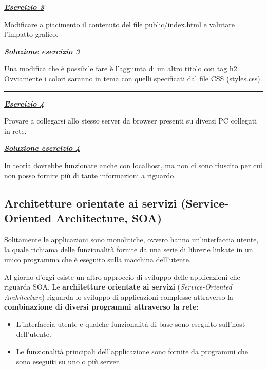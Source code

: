 \documentclass[a4paper]{article}
\newcommand{\longline}{\noindent\rule{\textwidth}{0.4pt}}
\begin{document}
	\noindent	
	\textcolor{Red3}{\textbf{\emph{\underline{Esercizio 3}}}}\newline
	
	\noindent
	Modificare a piacimento il contenuto del file \textsf{public/index.html} e valutare l'impatto grafico.\newline
	
	\noindent	
	\textcolor{Green4}{\textbf{\emph{\underline{Soluzione esercizio 3}}}}\newline
	
	\noindent
	Una modifica che è possibile fare è l'aggiunta di un altro titolo con tag h2. Ovviamente i colori saranno in tema con quelli specificati dal file CSS (styles.css).\newline
	
	\longline\newline
	
	\noindent	
	\textcolor{Red3}{\textbf{\emph{\underline{Esercizio 4}}}}\newline
	
	\noindent
	Provare a collegarsi allo stesso server da browser presenti su diversi PC collegati in rete.\newline
	
	\noindent	
	\textcolor{Green4}{\textbf{\emph{\underline{Soluzione esercizio 4}}}}\newline
	
	\noindent
	In teoria dovrebbe funzionare anche con localhost, ma non ci sono riuscito per cui non posso fornire più di tante informazioni a riguardo.\newpage
	
	\subsection{Architetture orientate ai servizi (Service-Oriented Architecture, SOA)}
	
	Solitamente le applicazioni sono monolitiche, ovvero hanno un'interfaccia utente, la quale richiama delle funzionalità fornite da una serie di librerie linkate in un unico programma che è eseguito sulla macchina dell'utente.\newline
	
	\noindent
	Al giorno d'oggi esiste un altro approccio di sviluppo delle applicazioni che riguarda SOA. Le \textcolor{Red3}{\textbf{architetture orientate ai servizi}} (\emph{Service-Oriented Architecture}) riguarda lo sviluppo di applicazioni complesse attraverso la \textbf{combinazione di diversi programmi attraverso la rete}:
	\begin{itemize}
		\item L'interfaccia utente e qualche funzionalità di base sono eseguito sull'host dell'utente.
		\item Le funzionalità principali dell'applicazione sono fornite da programmi che sono eseguiti su uno o più server.
	\end{itemize}
\end{document}
